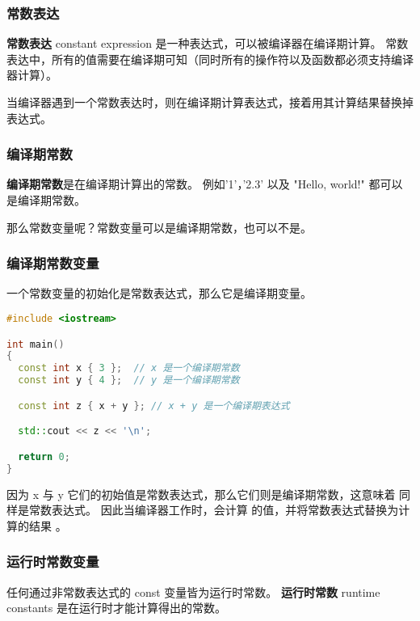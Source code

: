 \documentclass[../../LearnCpp.tex]{subfiles}
\begin{document}

\subsubsection*{常数表达}

\textbf{常数表达} constant expression 是一种表达式，可以被编译器在编译期计算。
常数表达中，所有的值需要在编译期可知（同时所有的操作符以及函数都必须支持编译器计算）。

当编译器遇到一个常数表达时，则在编译期计算表达式，接着用其计算结果替换掉表达式。

\subsubsection*{编译期常数}

\textbf{编译期常数}是在编译期计算出的常数。
例如'1'，'2.3' 以及 "Hello, world!" 都可以是编译期常数。

那么常数变量呢？常数变量可以是编译期常数，也可以不是。

\subsubsection*{编译期常数变量}

一个常数变量的初始化是常数表达式，那么它是编译期变量。

\begin{lstlisting}[language=C++]
#include <iostream>

int main()
{
  const int x { 3 };  // x 是一个编译期常数
  const int y { 4 };  // y 是一个编译期常数

  const int z { x + y }; // x + y 是一个编译期表达式

  std::cout << z << '\n';

  return 0;
}
\end{lstlisting}

因为 x 与 y 它们的初始值是常数表达式，那么它们则是编译期常数，这意味着  同样是常数表达式。
因此当编译器工作时，会计算  的值，并将常数表达式替换为计算的结果 。

\subsubsection*{运行时常数变量}

任何通过非常数表达式的 const 变量皆为运行时常数。
\textbf{运行时常数} runtime constants 是在运行时才能计算得出的常数。
\end{document}
